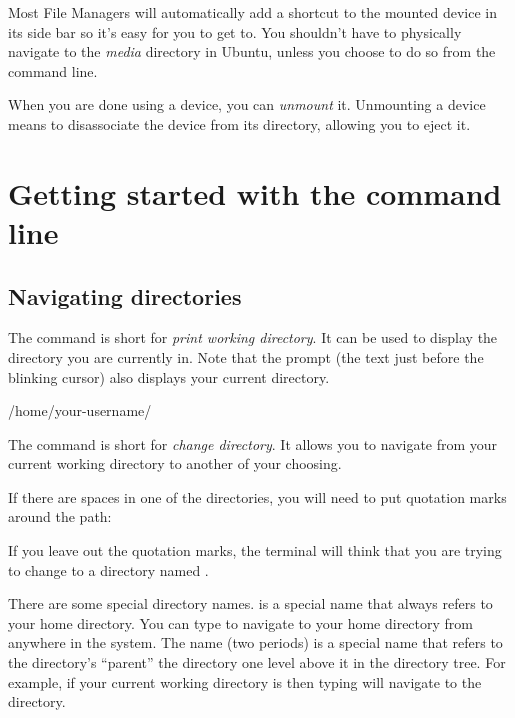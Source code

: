 Most File Managers will automatically add a shortcut to the mounted device in its side bar so it's easy for you to get to. You shouldn't have to physically navigate to the \emph{media} directory in Ubuntu, unless you choose to do so from the command line.

When you are done using a device, you can \emph{unmount} it. Unmounting a device means to disassociate the device from its directory, allowing you to eject it.

\section{Getting started with the command line}

\subsection{Navigating directories}

The  command is short for \emph{print working directory}. It can be used to 
display the directory you are currently in. Note that the prompt (the text just before the blinking cursor) also displays your current directory.

\begin{terminal}
\prompt {}
/home/your-username/
\end{terminal}

The  command is short for \emph{change directory}. It allows you to navigate from your current working directory to another of your choosing.

\begin{terminal}
\prompt {}
\end{terminal}

If there are spaces in one of the directories, you will need to put quotation marks around the path:

\begin{terminal}
\prompt {}
\end{terminal}

If you leave out the quotation marks, the terminal will think that you are trying to change to a directory named .

There are some special directory names. \code{\textasciitilde} is a special name that always refers to your home directory. You can type  to navigate to your home directory from anywhere in the system. The name  (two periods) is a special name that refers to the directory's ``parent'' \dash the directory one level above it in the directory tree. For example, if your current working directory is  then typing  will navigate to the  directory.

